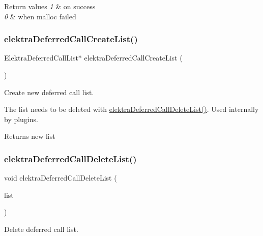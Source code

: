 \begin{DoxyRetVals}{Return values}
{\em 1} & on success \\
\hline
{\em 0} & when malloc failed \\
\hline
\end{DoxyRetVals}
\mbox{\label{group__invoke_gacff96e795f6fc2fad61ed2f8a5cd80cb}} 
\subsubsection{\texorpdfstring{elektraDeferredCallCreateList()}{elektraDeferredCallCreateList()}}
{\footnotesize\ttfamily Elektra\+Deferred\+Call\+List$\ast$ elektra\+Deferred\+Call\+Create\+List (\begin{DoxyParamCaption}\item[{void}]{ }\end{DoxyParamCaption})}



Create new deferred call list. 

The list needs to be deleted with \mbox{\hyperlink{group__invoke_ga7b9d8b37ebd5205fded885164d3ad6b7}{elektra\+Deferred\+Call\+Delete\+List()}}. Used internally by plugins.

\begin{DoxyReturn}{Returns}
new list 
\end{DoxyReturn}
\mbox{\label{group__invoke_ga7b9d8b37ebd5205fded885164d3ad6b7}} 
\subsubsection{\texorpdfstring{elektraDeferredCallDeleteList()}{elektraDeferredCallDeleteList()}}
{\footnotesize\ttfamily void elektra\+Deferred\+Call\+Delete\+List (\begin{DoxyParamCaption}\item[{Elektra\+Deferred\+Call\+List $\ast$}]{list }\end{DoxyParamCaption})}



Delete deferred call list. 

